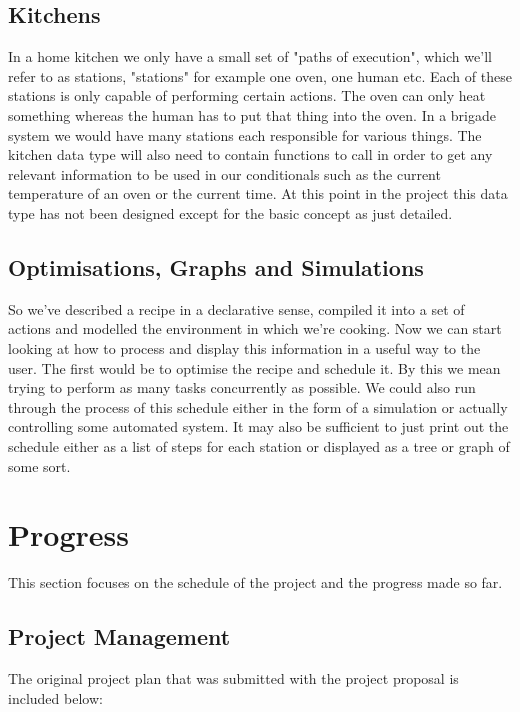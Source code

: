 \documentclass[11pt]{article}
\begin{document}
    \subsection{Kitchens}

    In a home kitchen we only have a small set of "paths of execution", which we'll refer to as stations,
    "stations" for example one oven, one human etc. Each of these stations is only capable of performing
    certain actions. The oven can only heat something whereas the human has to put that thing into the oven.
    In a brigade system we would have many stations each responsible for various things. The kitchen data
    type will also need to contain functions to call in order to get any relevant information to be used
    in our conditionals such as the current temperature of an oven or the current time. At this point in
    the project this data type has not been designed except for the basic concept as just detailed.

    \subsection{Optimisations, Graphs and Simulations}

    So we've described a recipe in a declarative sense, compiled it into a set of actions and modelled
    the environment in which we're cooking. Now we can start looking at how to process and display this
    information in a useful way to the user. The first would be to optimise the recipe and schedule it.
    By this we mean trying to perform as many tasks concurrently as possible. We could also run through
    the process of this schedule either in the form of a simulation or actually controlling some automated
    system. It may also be sufficient to just print out the schedule either as a list of steps for each
    station or displayed as a tree or graph of some sort.

    \section{Progress}

    This section focuses on the schedule of the project and the progress made so far.
    
    \subsection{Project Management}

    The original project plan that was submitted with the project proposal is included below:
\end{document}
